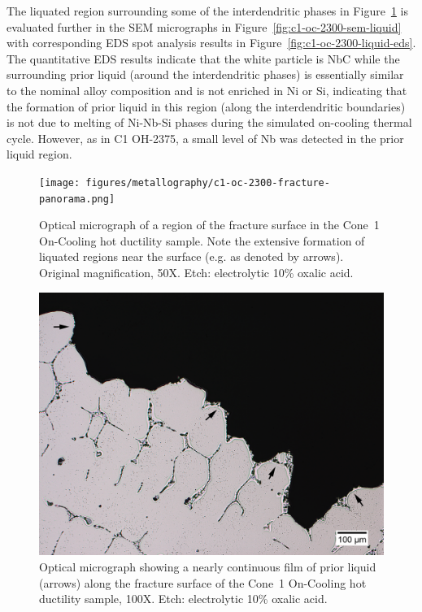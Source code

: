 {The liquated region surrounding some of the interdendritic phases in Figure~\ref{fig:c1-oc-2300-fracture-panorama} is evaluated further in the SEM micrographs in Figure~\ref{fig:c1-oc-2300-sem-liquid} with corresponding EDS spot analysis results in Figure~\ref{fig:c1-oc-2300-liquid-eds}. The quantitative EDS results indicate that the white particle is NbC while the surrounding prior liquid (around the interdendritic phases) is essentially similar to the nominal alloy composition and is not enriched in Ni or Si, indicating that the formation of prior liquid in this region (along the interdendritic boundaries) is not due to melting of Ni-Nb-Si phases during the simulated on-cooling thermal cycle. However, as in C1 OH-2375, a small level of Nb was detected in the prior liquid region.

\clearpage
\renewcommand{\headrulewidth}{0pt}
\thispagestyle{lscapedplain}
\begin{landscape}
\begin{figure}
    \centering
    \texttt{[image: figures/metallography/c1-oc-2300-fracture-panorama.png]}
    \caption[Optical micrograph of a region of the fracture surface in the Cone~1 On-Cooling \protect{} hot ductility sample.]{Optical micrograph of a region of the fracture surface in the Cone~1 On-Cooling \protect{} hot ductility sample. Note the extensive formation of liquated regions near the surface (e.g. as denoted by arrows). Original magnification, 50X. Etch: electrolytic 10\% oxalic acid.}
    \label{fig:c1-oc-2300-fracture-panorama}
\end{figure}
\end{landscape}
\clearpage


\begin{figure}
    \centering
    \includegraphics[width=4.7in]{figures/metallography/c1-oc-2300-liquation-surface-100x.png}
    \caption{Optical micrograph showing a nearly continuous film of prior liquid (arrows) along the fracture surface of the Cone~1 On-Cooling \protect{} hot ductility sample, 100X. Etch: electrolytic 10\% oxalic acid.}
    \label{fig:c1-oc-2300-liquation-surface}
\end{figure}

}
